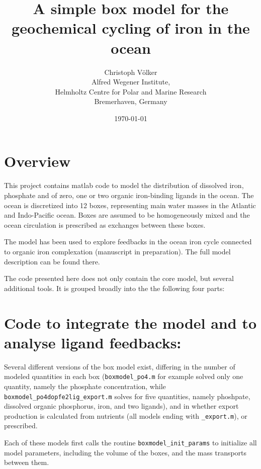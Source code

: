\documentclass[a4paper]{scrartcl}
\begin{document}
\title{A simple box model for the geochemical cycling of iron in the ocean}

\author{Christoph V\"olker \\
  Alfred Wegener Institute, \\
  Helmholtz Centre for Polar and Marine Research \\
  Bremerhaven, Germany}
\date{\today}

\maketitle

\section{Overview}

This project contains matlab code to model the distribution of dissolved iron, 
phosphate and of zero, one or two organic iron-binding ligands in the ocean. 
The ocean is discretized into 12 boxes, representing main water masses in the
Atlantic and Indo-Pacific ocean. Boxes are assumed to be homogeneously mixed
and the ocean circulation is prescribed as exchanges between these boxes.

The model has been used to explore feedbacks in the ocean iron cycle
connected to organic iron complexation (manuscript in
preparation). The full model description can be found there.

The code presented here does not only contain the core model, but
several additional tools. It is grouped broadly into the the following
four parts:

\section{Code to integrate the model and to analyse ligand
  feedbacks:}

Several different versions of the box model exist, differing in the
number of modeled quantities in each box (\verb+boxmodel_po4.m+ for
example solved only one quantity, namely the phosphate concentration,
while \verb+boxmodel_po4dopfe2lig_export.m+ solves for five
quantities, namely phoshpate, dissolved organic phosphorus, iron, and
two ligands), and in whether export production is calculated from
nutrients (all models ending with \verb+_export.m+), or
prescribed.

Each of these models first calls the routine
\verb+boxmodel_init_params+ to initialize all model parameters,
including the volume of the boxes, and the mass transports between
them.
\end{document}
